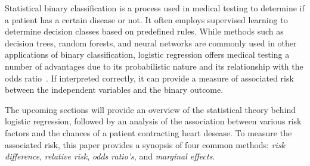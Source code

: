 Statistical binary classification is a process used in medical testing to determine if a patient has a certain disease or not.
It often employs supervised learning to determine decision classes based on predefined rules.
While methods such as decision trees, random forests, and neural networks are commonly used in other applications of binary classification, logistic regression offers medical testing a number of advantages due to its probabilistic nature and its relationship with the odds ratio~\citep{Schober2021-vs}. 
If interpreted correctly, it can provide a measure of associated risk between the independent variables and the binary outcome.

The upcoming sections will provide an overview of the statistical theory behind logistic regression, followed by an analysis of the association between various risk factors and the chances of a patient contracting heart desease. To measure the associated risk, this paper provides a synopsis of four common methods: \emph{risk difference}, \emph{relative risk}, \emph{odds ratio's}, and \emph{marginal effects}.